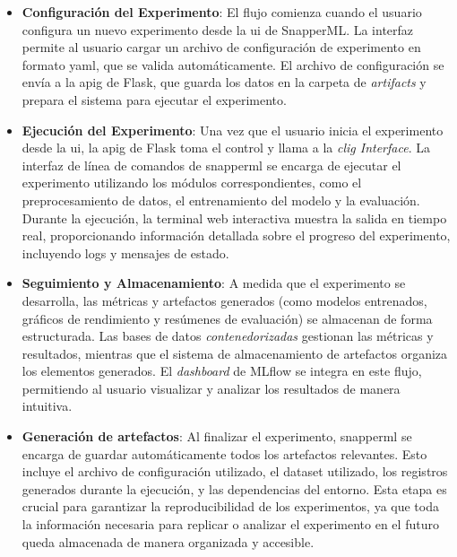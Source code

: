 \begin{itemize}
    \item \textbf{Configuración del Experimento}: El flujo comienza cuando el usuario configura un nuevo experimento desde la \acrshort{ui} de SnapperML. La interfaz permite al usuario cargar un archivo de configuración de experimento en formato \acrshort{yaml}, que se valida automáticamente. El archivo de configuración se envía a la \Gls{apig} de Flask, que guarda los datos en la carpeta de \textit{artifacts} y prepara el sistema para ejecutar el experimento.

    \item \textbf{Ejecución del Experimento}: Una vez que el usuario inicia el experimento desde la \acrshort{ui}, la \Gls{apig} de Flask toma el control y llama a la \textit{\Gls{clig} Interface}. La interfaz de línea de comandos de \Gls{snapperml} se encarga de ejecutar el experimento utilizando los módulos correspondientes, como el preprocesamiento de datos, el entrenamiento del modelo y la evaluación. Durante la ejecución, la terminal web interactiva muestra la salida en tiempo real, proporcionando información detallada sobre el progreso del experimento, incluyendo logs y mensajes de estado.

    \item \textbf{Seguimiento y Almacenamiento}: A medida que el experimento se desarrolla, las métricas y \gls{artefactos} generados (como modelos entrenados, gráficos de rendimiento y resúmenes de evaluación) se almacenan de forma estructurada. Las bases de datos \textit{contenedorizadas} gestionan las métricas y resultados, mientras que el sistema de almacenamiento de \gls{artefactos} organiza los elementos generados. El \textit{dashboard} de MLflow se integra en este flujo, permitiendo al usuario visualizar y analizar los resultados de manera intuitiva.

    \item \textbf{Generación de \Gls{artefactos}}: Al finalizar el experimento, \Gls{snapperml} se encarga de guardar automáticamente todos los \gls{artefactos} relevantes. Esto incluye el archivo de configuración utilizado, el dataset utilizado, los registros generados durante la ejecución, y las dependencias del entorno. Esta etapa es crucial para garantizar la reproducibilidad de los experimentos, ya que toda la información necesaria para replicar o analizar el experimento en el futuro queda almacenada de manera organizada y accesible.
\end{itemize}

